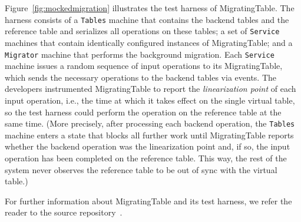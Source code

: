 Figure~\ref{fig:mockedmigration} illustrates the \psharp test harness of MigratingTable. The harness consists of a \texttt{Tables} machine that contains the backend tables and the reference table and serializes all operations on these tables; a set of \texttt{Service} machines that contain identically configured instances of MigratingTable; and a \texttt{Migrator} machine that performs the background migration. Each \texttt{Service} machine issues a random sequence of input operations to its MigratingTable, which sends the necessary operations to the backend tables via \psharp events. The developers instrumented MigratingTable to report the \emph{linearization point} of each input operation, i.e., the time at which it takes effect on the single virtual table, so the test harness could perform the operation on the reference table at the same time. (More precisely, after processing each backend operation, the \texttt{Tables} machine enters a \psharp state that blocks all further work until MigratingTable reports whether the backend operation was the linearization point and, if so, the input operation has been completed on the reference table. This way, the rest of the system never observes the reference table to be out of sync with the virtual table.)

For further information about MigratingTable and its \psharp test harness, we refer the reader to the source repository~\cite{migratingtable-src}.



